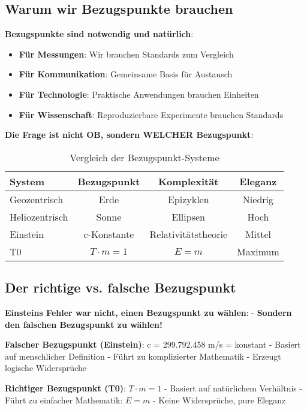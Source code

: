\documentclass[12pt,a4paper]{article}
\newcommand{\Tfield}{T}
\begin{document}
	\subsection{Warum wir Bezugspunkte brauchen}
	
	\textbf{Bezugspunkte sind notwendig und natürlich}:
	\begin{itemize}
		\item \textbf{Für Messungen}: Wir brauchen Standards zum Vergleich
		\item \textbf{Für Kommunikation}: Gemeinsame Basis für Austausch
		\item \textbf{Für Technologie}: Praktische Anwendungen brauchen Einheiten
		\item \textbf{Für Wissenschaft}: Reproduzierbare Experimente brauchen Standards
	\end{itemize}
	
	\textbf{Die Frage ist nicht OB, sondern WELCHER Bezugspunkt}:
	
	\begin{table}[htbp]
		\centering
		\begin{tabular}{|l|c|c|c|}
			\hline
			\textbf{System} & \textbf{Bezugspunkt} & \textbf{Komplexität} & \textbf{Eleganz} \\
			\hline
			Geozentrisch & Erde & Epizyklen & Niedrig \\
			Heliozentrisch & Sonne & Ellipsen & Hoch \\
			Einstein & c-Konstante & Relativitätstheorie & Mittel \\
			T0 & $\Tfield \cdot m = 1$ & $E = m$ & Maximum \\
			\hline
		\end{tabular}
		\caption{Vergleich der Bezugspunkt-Systeme}
	\end{table}
	
	\subsection{Der richtige vs. falsche Bezugspunkt}
	
	\textbf{Einsteins Fehler war nicht, einen Bezugspunkt zu wählen}:
	- \textbf{Sondern den falschen Bezugspunkt zu wählen!}
	
	\textbf{Falscher Bezugspunkt (Einstein)}: c = 299.792.458 m/s = konstant
	- Basiert auf menschlicher Definition
	- Führt zu komplizierter Mathematik
	- Erzeugt logische Widersprüche
	
	\textbf{Richtiger Bezugspunkt (T0)}: $\Tfield \cdot m = 1$
	- Basiert auf natürlichem Verhältnis
	- Führt zu einfacher Mathematik: $E = m$
	- Keine Widersprüche, pure Eleganz
	
\end{document}
